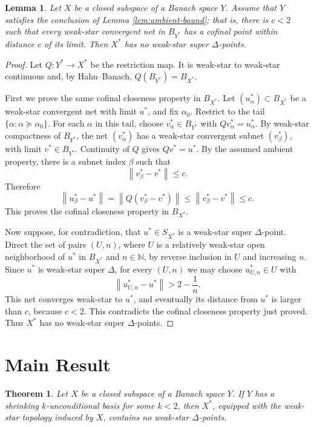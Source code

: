 \documentclass[11pt]{article}
\newtheorem{theorem}{Theorem}
\newtheorem{lemma}{Lemma}
\newcommand{\norm}[1]{\left\lVert #1 \right\rVert}
\newcommand{\ball}{B}
\begin{document}
\begin{lemma}\label{lem:quotient-transfer}
Let \(X\) be a closed subspace of a Banach space \(Y\).  Assume that \(Y\)
satisfies the conclusion of Lemma \ref{lem:ambient-bound}; that is, there is
\(c<2\) such that every weak-star convergent net in \(\ball_{Y^*}\) has a
cofinal point within distance \(c\) of its limit.  Then \(X^*\) has no
weak-star super \(\Delta\)-points.
\end{lemma}

\begin{proof}
Let \(Q:Y^*\to X^*\) be the restriction map.  It is weak-star to weak-star
continuous and, by Hahn--Banach, \(Q(\ball_{Y^*})=\ball_{X^*}\).

First we prove the same cofinal closeness property in \(\ball_{X^*}\).
Let \((u_\alpha^*)\subset\ball_{X^*}\) be a weak-star convergent net with
limit \(u^*\), and fix \(\alpha_0\).  Restrict to the tail
\(\{\alpha:\alpha\succeq\alpha_0\}\).  For each \(\alpha\) in this tail,
choose \(v_\alpha^*\in\ball_{Y^*}\) with \(Qv_\alpha^*=u_\alpha^*\).  By
weak-star compactness of \(\ball_{Y^*}\), the net \((v_\alpha^*)\) has a
weak-star convergent subnet \((v_\beta^*)\), with limit \(v^*\in\ball_{Y^*}\).
Continuity of \(Q\) gives \(Qv^*=u^*\).  By the assumed ambient property,
there is a subnet index \(\beta\) such that
\[
  \norm{v_\beta^*-v^*}\le c.
\]
Therefore
\[
  \norm{u_\beta^*-u^*}
  =\norm{Q(v_\beta^*-v^*)}
  \le \norm{v_\beta^*-v^*}
  \le c.
\]
This proves the cofinal closeness property in \(\ball_{X^*}\).

Now suppose, for contradiction, that \(u^*\in S_{X^*}\) is a weak-star super
\(\Delta\)-point.  Direct the set of pairs \((U,n)\), where \(U\) is a
relatively weak-star open neighborhood of \(u^*\) in \(\ball_{X^*}\) and
\(n\in\mathbb{N}\), by reverse inclusion in \(U\) and increasing \(n\).  Since
\(u^*\) is weak-star super \(\Delta\), for every \((U,n)\) we may choose
\(u_{U,n}^*\in U\) with
\[
  \norm{u_{U,n}^*-u^*}>2-\frac1n .
\]
This net converges weak-star to \(u^*\), and eventually its distance from
\(u^*\) is larger than \(c\), because \(c<2\).  This contradicts the cofinal
closeness property just proved.  Thus \(X^*\) has no weak-star super
\(\Delta\)-points.
\end{proof}

\section*{Main Result}

\begin{theorem}\label{thm:main}
Let \(X\) be a closed subspace of a Banach space \(Y\).  If \(Y\) has a
shrinking \(k\)-unconditional basis for some \(k<2\), then \(X^*\), equipped
with the weak-star topology induced by \(X\), contains no weak-star
\(\Delta\)-points.
\end{theorem}
\end{document}
